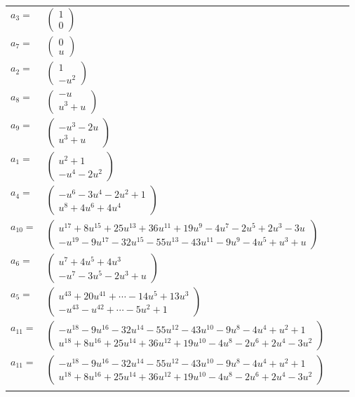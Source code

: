 \documentclass[1p]{elsarticle_modified}
\theoremstyle{definition}
\begin{document}
\begin{tabular}{m{7pt} m{180pt} m{7pt} m{180pt} }
\flushright $a_{3}=$&$\begin{pmatrix}1\\0\end{pmatrix}$ \\
\flushright $a_{7}=$&$\begin{pmatrix}0\\u\end{pmatrix}$ \\
\flushright $a_{2}=$&$\begin{pmatrix}1\\- u^2\end{pmatrix}$ \\
\flushright $a_{8}=$&$\begin{pmatrix}- u\\u^3+u\end{pmatrix}$ \\
\flushright $a_{9}=$&$\begin{pmatrix}- u^3-2 u\\u^3+u\end{pmatrix}$ \\
\flushright $a_{1}=$&$\begin{pmatrix}u^2+1\\- u^4-2 u^2\end{pmatrix}$ \\
\flushright $a_{4}=$&$\begin{pmatrix}- u^6-3 u^4-2 u^2+1\\u^8+4 u^6+4 u^4\end{pmatrix}$ \\
\flushright $a_{10}=$&$\begin{pmatrix}u^{17}+8 u^{15}+25 u^{13}+36 u^{11}+19 u^9-4 u^7-2 u^5+2 u^3-3 u\\- u^{19}-9 u^{17}-32 u^{15}-55 u^{13}-43 u^{11}-9 u^9-4 u^5+u^3+u\end{pmatrix}$ \\
\flushright $a_{6}=$&$\begin{pmatrix}u^7+4 u^5+4 u^3\\- u^7-3 u^5-2 u^3+u\end{pmatrix}$ \\
\flushright $a_{5}=$&$\begin{pmatrix}u^{43}+20 u^{41}+\cdots-14 u^5+13 u^3\\- u^{43}- u^{42}+\cdots-5 u^2+1\end{pmatrix}$ \\
\flushright $a_{11}=$&$\begin{pmatrix}- u^{18}-9 u^{16}-32 u^{14}-55 u^{12}-43 u^{10}-9 u^8-4 u^4+u^2+1\\u^{18}+8 u^{16}+25 u^{14}+36 u^{12}+19 u^{10}-4 u^8-2 u^6+2 u^4-3 u^2\end{pmatrix}$\\ \flushright $a_{11}=$&$\begin{pmatrix}- u^{18}-9 u^{16}-32 u^{14}-55 u^{12}-43 u^{10}-9 u^8-4 u^4+u^2+1\\u^{18}+8 u^{16}+25 u^{14}+36 u^{12}+19 u^{10}-4 u^8-2 u^6+2 u^4-3 u^2\end{pmatrix}$\\&\end{tabular}
\end{document}
